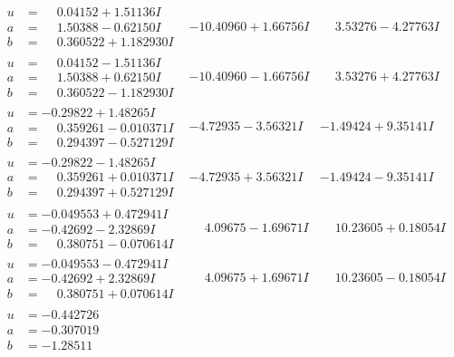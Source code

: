 \documentclass[1p]{elsarticle_modified}
\theoremstyle{definition}
\begin{document}
$$\begin{array}{c|c|c}
\begin{aligned}
u &= \phantom{-}0.04152 + 1.51136 I \\
a &= \phantom{-}1.50388 - 0.62150 I \\
b &= \phantom{-}0.360522 + 1.182930 I\end{aligned}
 & -10.40960 + 1.66756 I & \phantom{-}3.53276 - 4.27763 I \\ \hline\begin{aligned}
u &= \phantom{-}0.04152 - 1.51136 I \\
a &= \phantom{-}1.50388 + 0.62150 I \\
b &= \phantom{-}0.360522 - 1.182930 I\end{aligned}
 & -10.40960 - 1.66756 I & \phantom{-}3.53276 + 4.27763 I \\ \hline\begin{aligned}
u &= -0.29822 + 1.48265 I \\
a &= \phantom{-}0.359261 - 0.010371 I \\
b &= \phantom{-}0.294397 - 0.527129 I\end{aligned}
 & -4.72935 - 3.56321 I & -1.49424 + 9.35141 I \\ \hline\begin{aligned}
u &= -0.29822 - 1.48265 I \\
a &= \phantom{-}0.359261 + 0.010371 I \\
b &= \phantom{-}0.294397 + 0.527129 I\end{aligned}
 & -4.72935 + 3.56321 I & -1.49424 - 9.35141 I \\ \hline\begin{aligned}
u &= -0.049553 + 0.472941 I \\
a &= -0.42692 - 2.32869 I \\
b &= \phantom{-}0.380751 - 0.070614 I\end{aligned}
 & \phantom{-}4.09675 - 1.69671 I & \phantom{-}10.23605 + 0.18054 I \\ \hline\begin{aligned}
u &= -0.049553 - 0.472941 I \\
a &= -0.42692 + 2.32869 I \\
b &= \phantom{-}0.380751 + 0.070614 I\end{aligned}
 & \phantom{-}4.09675 + 1.69671 I & \phantom{-}10.23605 - 0.18054 I \\ \hline\begin{aligned}
u &= -0.442726\phantom{ +0.000000I} \\
a &= -0.307019\phantom{ +0.000000I} \\
b &= -1.28511\phantom{ +0.000000I}\end{aligned}

\end{array}$$
\end{document}
